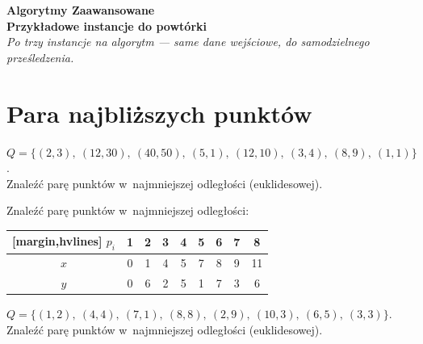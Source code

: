 




\begin{center}
	{\LARGE\bfseries\color{accent} Algorytmy Zaawansowane}\\[0.3cm]
	{\large\bfseries Przykładowe instancje do powtórki}\\[0.2cm]
	{\small\itshape Po trzy instancje na algorytm --- same dane wejściowe, do samodzielnego prześledzenia.}
\end{center}
\bigskip

\tableofcontents
\newpage

\section{Para najbliższych punktów}

\begin{example}
	$Q = \{(2,3),\ (12,30),\ (40,50),\ (5,1),\ (12,10),\ (3,4),\ (8,9),\ (1,1)\}$.\\
	Znaleźć parę punktów w~najmniejszej odległości (euklidesowej).
\end{example}

\begin{example}
	Znaleźć parę punktów w~najmniejszej odległości:
	\begin{aztable}
		\centering
		\renewcommand{\arraystretch}{1.2}
		\begin{NiceTabular}{c|cccccccc}[margin,hvlines]
			$p_i$ & 1 & 2 & 3 & 4 & 5 & 6 & 7 & 8 \\
			\hline
			$x$   & 0 & 1 & 4 & 5 & 7 & 8 & 9 & 11 \\
			$y$   & 0 & 6 & 2 & 5 & 1 & 7 & 3 & 6
		\end{NiceTabular}
	\end{aztable}
\end{example}

	\begin{example}
		$Q = \{(1,2),\ (4,4),\ (7,1),\ (8,8),\ (2,9),\ (10,3),\ (6,5),\ (3,3)\}$.\\
		Znaleźć parę punktów w~najmniejszej odległości (euklidesowej).
	\end{example}

